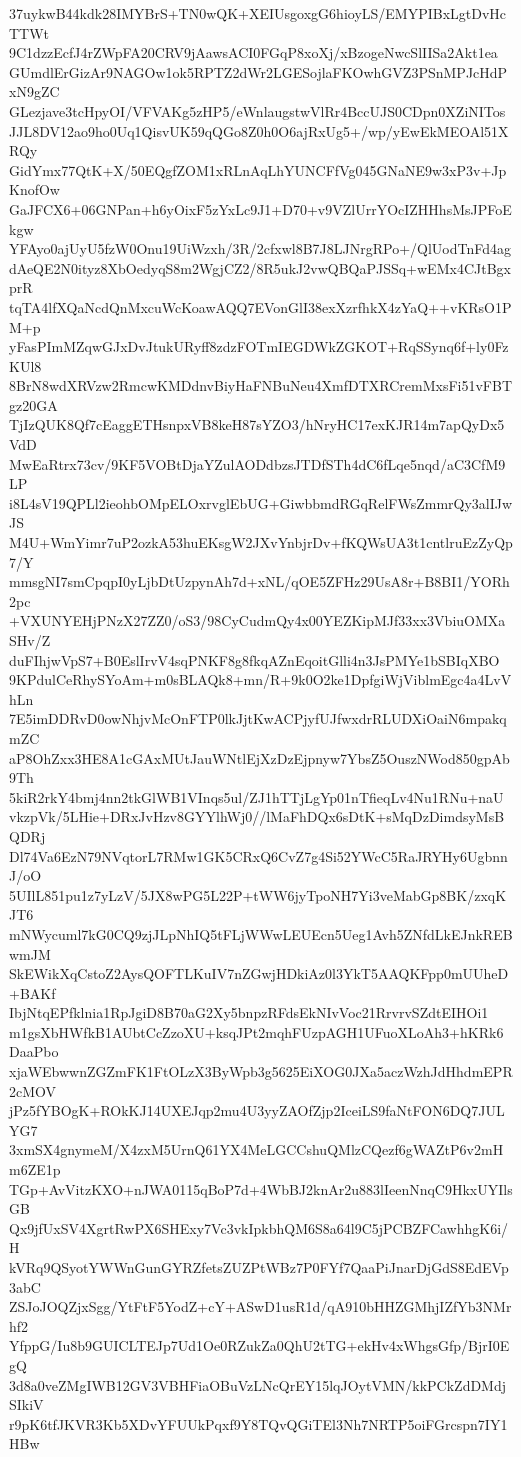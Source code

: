 37uykwB44kdk28IMYBrS+TN0wQK+XEIUsgoxgG6hioyLS/EMYPIBxLgtDvHcTTWt
9C1dzzEcfJ4rZWpFA20CRV9jAawsACI0FGqP8xoXj/xBzogeNwcSlIISa2Akt1ea
GUmdlErGizAr9NAGOw1ok5RPTZ2dWr2LGESojlaFKOwhGVZ3PSnMPJcHdPxN9gZC
GLezjave3tcHpyOI/VFVAKg5zHP5/eWnlaugstwVlRr4BccUJS0CDpn0XZiNITos
JJL8DV12ao9ho0Uq1QisvUK59qQGo8Z0h0O6ajRxUg5+/wp/yEwEkMEOAl51XRQy
GidYmx77QtK+X/50EQgfZOM1xRLnAqLhYUNCFfVg045GNaNE9w3xP3v+JpKnofOw
GaJFCX6+06GNPan+h6yOixF5zYxLc9J1+D70+v9VZlUrrYOcIZHHhsMsJPFoEkgw
YFAyo0ajUyU5fzW0Onu19UiWzxh/3R/2cfxwl8B7J8LJNrgRPo+/QlUodTnFd4ag
dAeQE2N0ityz8XbOedyqS8m2WgjCZ2/8R5ukJ2vwQBQaPJSSq+wEMx4CJtBgxprR
tqTA4lfXQaNcdQnMxcuWcKoawAQQ7EVonGlI38exXzrfhkX4zYaQ++vKRsO1PM+p
yFasPImMZqwGJxDvJtukURyff8zdzFOTmIEGDWkZGKOT+RqSSynq6f+ly0FzKUl8
8BrN8wdXRVzw2RmcwKMDdnvBiyHaFNBuNeu4XmfDTXRCremMxsFi51vFBTgz20GA
TjIzQUK8Qf7cEaggETHsnpxVB8keH87sYZO3/hNryHC17exKJR14m7apQyDx5VdD
MwEaRtrx73cv/9KF5VOBtDjaYZulAODdbzsJTDfSTh4dC6fLqe5nqd/aC3CfM9LP
i8L4sV19QPLl2ieohbOMpELOxrvglEbUG+GiwbbmdRGqRelFWsZmmrQy3alIJwJS
M4U+WmYimr7uP2ozkA53huEKsgW2JXvYnbjrDv+fKQWsUA3t1cntlruEzZyQp7/Y
mmsgNI7smCpqpI0yLjbDtUzpynAh7d+xNL/qOE5ZFHz29UsA8r+B8BI1/YORh2pc
+VXUNYEHjPNzX27ZZ0/oS3/98CyCudmQy4x00YEZKipMJf33xx3VbiuOMXaSHv/Z
duFIhjwVpS7+B0EslIrvV4sqPNKF8g8fkqAZnEqoitGlli4n3JsPMYe1bSBIqXBO
9KPdulCeRhySYoAm+m0sBLAQk8+mn/R+9k0O2ke1DpfgiWjViblmEgc4a4LvVhLn
7E5imDDRvD0owNhjvMcOnFTP0lkJjtKwACPjyfUJfwxdrRLUDXiOaiN6mpakqmZC
aP8OhZxx3HE8A1cGAxMUtJauWNtlEjXzDzEjpnyw7YbsZ5OuszNWod850gpAb9Th
5kiR2rkY4bmj4nn2tkGlWB1VInqs5ul/ZJ1hTTjLgYp01nTfieqLv4Nu1RNu+naU
vkzpVk/5LHie+DRxJvHzv8GYYlhWj0//lMaFhDQx6sDtK+sMqDzDimdsyMsBQDRj
Dl74Va6EzN79NVqtorL7RMw1GK5CRxQ6CvZ7g4Si52YWcC5RaJRYHy6UgbnnJ/oO
5UIlL851pu1z7yLzV/5JX8wPG5L22P+tWW6jyTpoNH7Yi3veMabGp8BK/zxqKJT6
mNWycuml7kG0CQ9zjJLpNhIQ5tFLjWWwLEUEcn5Ueg1Avh5ZNfdLkEJnkREBwmJM
SkEWikXqCstoZ2AysQOFTLKuIV7nZGwjHDkiAz0l3YkT5AAQKFpp0mUUheD+BAKf
IbjNtqEPfklnia1RpJgiD8B70aG2Xy5bnpzRFdsEkNIvVoc21RrvrvSZdtEIHOi1
m1gsXbHWfkB1AUbtCcZzoXU+ksqJPt2mqhFUzpAGH1UFuoXLoAh3+hKRk6DaaPbo
xjaWEbwwnZGZmFK1FtOLzX3ByWpb3g5625EiXOG0JXa5aczWzhJdHhdmEPR2cMOV
jPz5fYBOgK+ROkKJ14UXEJqp2mu4U3yyZAOfZjp2IceiLS9faNtFON6DQ7JULYG7
3xmSX4gnymeM/X4zxM5UrnQ61YX4MeLGCCshuQMlzCQezf6gWAZtP6v2mHm6ZE1p
TGp+AvVitzKXO+nJWA0115qBoP7d+4WbBJ2knAr2u883lIeenNnqC9HkxUYIlsGB
Qx9jfUxSV4XgrtRwPX6SHExy7Vc3vkIpkbhQM6S8a64l9C5jPCBZFCawhhgK6i/H
kVRq9QSyotYWWnGunGYRZfetsZUZPtWBz7P0FYf7QaaPiJnarDjGdS8EdEVp3abC
ZSJoJOQZjxSgg/YtFtF5YodZ+cY+ASwD1usR1d/qA910bHHZGMhjIZfYb3NMrhf2
YfppG/Iu8b9GUICLTEJp7Ud1Oe0RZukZa0QhU2tTG+ekHv4xWhgsGfp/BjrI0EgQ
3d8a0veZMgIWB12GV3VBHFiaOBuVzLNcQrEY15lqJOytVMN/kkPCkZdDMdjSIkiV
r9pK6tfJKVR3Kb5XDvYFUUkPqxf9Y8TQvQGiTEl3Nh7NRTP5oiFGrcspn7IY1HBw
